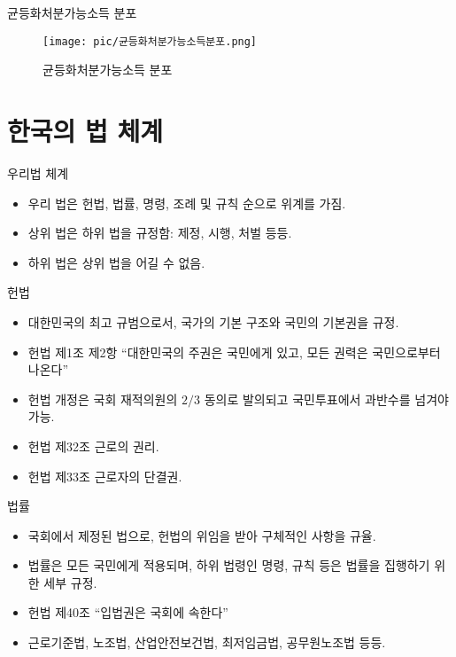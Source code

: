 \documentclass[aspectratio=169,xcolor=dvipsnames,handout]{beamer}
\begin{document}
\begin{frame}{균등화처분가능소득 분포}
\centering
\begin{figure}
    \texttt{[image: pic/균등화처분가능소득분포.png]}
    \caption{균등화처분가능소득 분포}
\end{figure}
\end{frame}

\section{한국의 법 체계}

\begin{frame}{우리법 체계}
    \begin{itemize}
        \item 우리 법은 헌법, 법률, 명령, 조례 및 규칙 순으로 위계를 가짐.
        \item 상위 법은 하위 법을 규정함: 제정, 시행, 처벌 등등.
        \item 하위 법은 상위 법을 어길 수 없음.
    \end{itemize}
\end{frame}

\begin{frame}{헌법}
    \begin{itemize}
        \item 대한민국의 최고 규범으로서, 국가의 기본 구조와 국민의 기본권을 규정.
        \item 헌법 제1조 제2항 ``대한민국의 주권은 국민에게 있고, 모든 권력은 국민으로부터 나온다''
        \item 헌법 개정은 국회 재적의원의 $2/3$ 동의로 발의되고 국민투표에서 과반수를 넘겨야 가능.
        \item 헌법 제32조 근로의 권리.
        \item 헌법 제33조 근로자의 단결권.
    \end{itemize}
\end{frame}

\begin{frame}{법률}
    \begin{itemize}
        \item 국회에서 제정된 법으로, 헌법의 위임을 받아 구체적인 사항을 규율.
        \item 법률은 모든 국민에게 적용되며, 하위 법령인 명령, 규칙 등은 법률을 집행하기 위한 세부 규정.
        \item 헌법 제40조 ``입법권은 국회에 속한다''
        \item 근로기준법, 노조법, 산업안전보건법, 최저임금법, 공무원노조법 등등.
    \end{itemize}
\end{frame}
\end{document}
